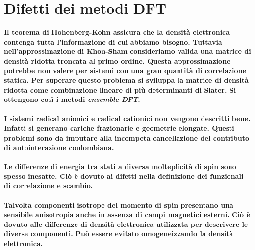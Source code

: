 \documentclass[oneside]{amsbook}
\numberwithin{section}{chapter}
\numberwithin{equation}{section}
\numberwithin{figure}{section}
\begin{document}
\section{Difetti dei metodi DFT}
\paragraph{Il teorema di Hohenberg-Kohn assicura che la densità elettronica contenga tutta l'informazione di cui abbiamo bisogno. Tuttavia nell'approssimazione di Khon-Sham consideriamo valida una matrice di densità ridotta troncata al primo ordine. Questa approssimazione potrebbe non valere per sistemi con una gran quantità di correlazione statica. Per superare questo problema si sviluppa la matrice di densità ridotta come combinazione lineare di più determinanti di Slater. Si ottengono così i metodi \emph{ensemble DFT}.\\}
 \paragraph{I sistemi radical anionici e radical cationici non vengono descritti bene. Infatti si generano cariche frazionarie e geometrie elongate. Questi problemi sono da imputare alla incompeta cancellazione del contributo di autointerazione coulombiana.\\}
 \paragraph{Le differenze di energia tra stati a diversa molteplicità di spin sono spesso inesatte. Ciò è dovuto ai difetti nella definizione dei funzionali di correlazione e scambio.\\}
 \paragraph{Talvolta componenti isotrope del momento di spin presentano una sensibile anisotropia anche in assenza di campi magnetici esterni. Ciò è dovuto alle differenze di densità elettronica utilizzata per descrivere le diverse componenti. Può essere evitato omogeneizzando la densità elettronica.}
\end{document}

